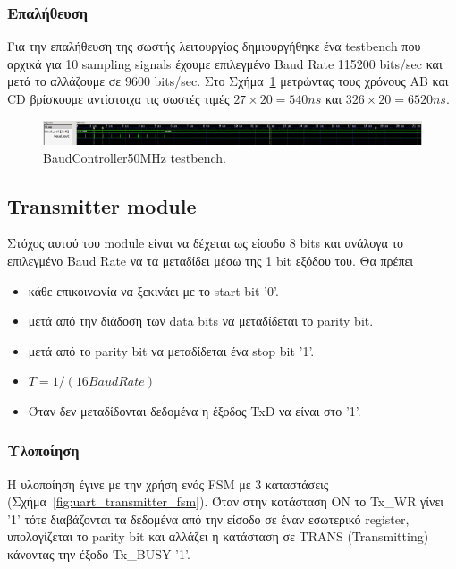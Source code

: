 \documentclass[../main.tex]{subfiles}
\begin{document}
\subsubsection*{Επαλήθευση}
Για την επαλήθευση της σωστής λειτουργίας δημιουργήθηκε ένα testbench που αρχικά
για 10 sampling signals έχουμε επιλεγμένο Baud Rate 115200 bits/sec και μετά το
αλλάζουμε σε 9600 bits/sec. Στο Σχήμα~\ref{fig:baud_controller_tb} μετρώντας
τους χρόνους AB και CD βρίσκουμε αντίστοιχα τις σωστές τιμές $27\times20=540ns$ 
και $326\times20=6520ns$.

\begin{figure}[H]
  \begin{center}
    \includegraphics[width=\textwidth]{../images/baud_controller_tb.png}
  \end{center}
  \caption{BaudController50MHz testbench.}
  \label{fig:baud_controller_tb}
\end{figure}


\subsection{Transmitter module}

Στόχος αυτού του module είναι να δέχεται ως είσοδο 8 bits και ανάλογα το
επιλεγμένο Baud Rate να τα μεταδίδει μέσω της 1 bit εξόδου του. Θα πρέπει 

\begin{itemize}
  \item κάθε επικοινωνία να ξεκινάει με το start bit '0'.
  \item μετά από την διάδοση των data bits να μεταδίδεται το parity bit.
  \item μετά από το parity bit να μεταδίδεται ένα stop bit '1'.
  \item $T = 1/(16 BaudRate)$
  \item Όταν δεν μεταδίδονται δεδομένα η έξοδος TxD να είναι στο '1'.
\end{itemize}

\subsubsection*{Υλοποίηση}

Η υλοποίηση έγινε με την χρήση ενός FSM με 3 καταστάσεις
(Σχήμα~\ref{fig:uart_transmitter_fsm}). Όταν στην κατάσταση ON το Tx\_WR γίνει
'1' τότε διαβάζονται τα δεδομένα από την είσοδο σε έναν εσωτερικό register,
υπολογίζεται το parity bit και αλλάζει η κατάσταση σε TRANS (Transmitting)
κάνοντας την έξοδο Tx\_BUSY '1'. 
\end{document}
